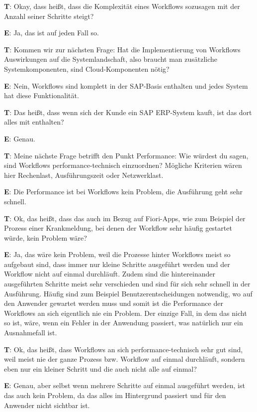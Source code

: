 \begin{list}{X:}{\setlength{\labelsep}{5mm}}
 \item[\textbf{T}:] Okay, dass hei{\ss}t, dass die Komplexität eines Workflows sozusagen mit der Anzahl seiner Schritte steigt? 
 \item[\textbf{E}:] Ja, das ist auf jeden Fall so.
 \item[\textbf{T}:] Kommen wir zur nächsten Frage: Hat die Implementierung von Workflows Auswirkungen auf die Systemlandschaft, also braucht man zusätzliche Systemkomponenten, sind Cloud-Komponenten nötig?
 \item[\textbf{E}:] Nein, Workflows sind komplett in der SAP-Basis enthalten und jedes System hat diese Funktionalität.
 \item[\textbf{T}:] Das hei{\ss}t, dass wenn sich der Kunde ein SAP ERP-System kauft, ist das dort alles mit enthalten?
 \item[\textbf{E}:] Genau.
 \item[\textbf{T}:] Meine nächste Frage betrifft den Punkt Performance: Wie würdest du sagen, sind Workflows performance-technisch einzuordnen? Mögliche Kriterien wären hier Rechenlast, Ausführungszeit oder Netzwerklast.
 \item[\textbf{E}:] Die Performance ist bei Workflows kein Problem, die Ausführung geht sehr schnell.
 \item[\textbf{T}:] Ok, das hei{\ss}t, dass das auch im Bezug auf Fiori-Apps, wie zum Beispiel der Prozess einer Krankmeldung, bei denen der Workflow sehr häufig gestartet würde, kein Problem wäre?
 \item[\textbf{E}:] Ja, das wäre kein Problem, weil die Prozesse hinter Workflows meist so aufgebaut sind, dass immer nur kleine Schritte ausgeführt werden und der Workflow nicht auf einmal durchläuft. Zudem sind die hintereinander ausgeführten Schritte meist sehr verschieden und sind für sich sehr schnell in der Ausführung. Häufig sind zum Beispiel Benutzerentscheidungen notwendig, wo auf den Anwender gewartet werden muss und somit ist die Performance der Workflows an sich eigentlich nie ein Problem. Der einzige Fall, in dem das nicht so ist, wäre, wenn ein Fehler in der Anwendung passiert, was natürlich nur ein Ausnahmefall ist.
 \item[\textbf{T}:] Ok, das hei{\ss}t, dass Workflows an sich performance-technisch sehr gut sind, weil meist nie der ganze Prozess bzw. Workflow auf einmal durchläuft, sondern eben nur ein kleiner Schritt und die auch nicht alle auf einmal?
 \item[\textbf{E}:] Genau, aber selbst wenn mehrere Schritte auf einmal ausgeführt werden, ist das auch kein Problem, da das alles im Hintergrund passiert und für den Anwender nicht sichtbar ist.

\end{list}
